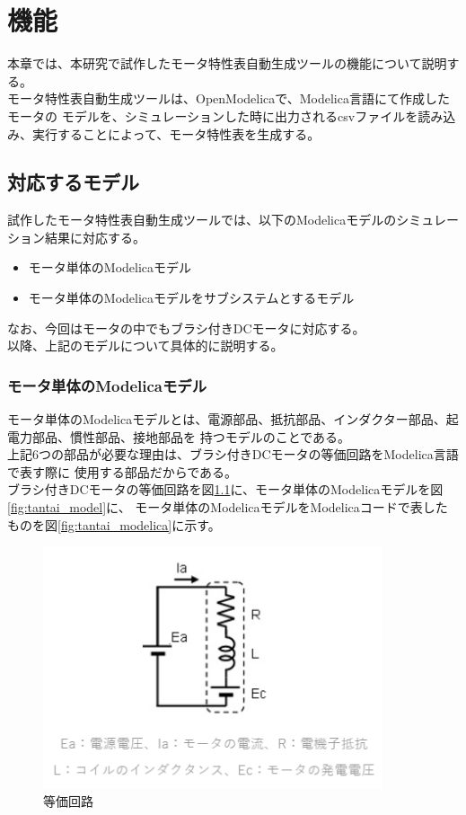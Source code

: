 \chapter{機能}\label{cha:Function}

本章では、本研究で試作したモータ特性表自動生成ツールの機能について説明する。\\

モータ特性表自動生成ツールは、OpenModelicaで、Modelica言語にて作成したモータの
モデルを、シミュレーションした時に出力されるcsvファイルを読み込み、実行することによって、モータ特性表を生成する。\\

\section{対応するモデル}\label{taioumodel}
試作したモータ特性表自動生成ツールでは、以下のModelicaモデルのシミュレーション結果に対応する。
\begin{itemize}
	\item モータ単体のModelicaモデル
	\item モータ単体のModelicaモデルをサブシステムとするモデル
\end{itemize}
なお、今回はモータの中でもブラシ付きDCモータに対応する。\\
以降、上記のモデルについて具体的に説明する。

\subsection{モータ単体のModelicaモデル}\label{sec:sub1}
モータ単体のModelicaモデルとは、電源部品、抵抗部品、インダクター部品、起電力部品、慣性部品、接地部品を
持つモデルのことである。\\
上記6つの部品が必要な理由は、ブラシ付きDCモータの等価回路\cite{等価回路}をModelica言語で表す際に
使用する部品\cite{modelicaシステム本}だからである。\\
ブラシ付きDCモータの等価回路を図\ref{fig:touka}に、モータ単体のModelicaモデルを図\ref{fig:tantai_model}に、
モータ単体のModelicaモデルをModelicaコードで表したものを図\ref{fig:tantai_modelica}に示す。

\begin{figure}[t]
	\centering
	\includegraphics[width=10cm]{./Image/touka.png}
	\caption{等価回路}
	\label{fig:touka}
  \end{figure}

